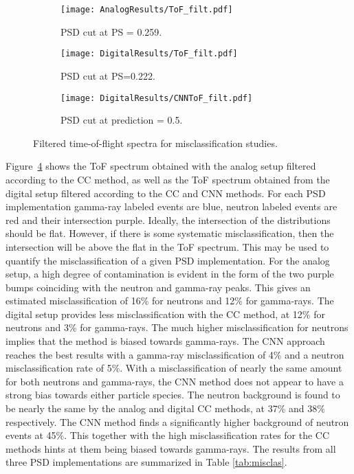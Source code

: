 \documentclass[main.tex]{subfiles}
\begin{document}
\begin{figure}
    \centering
    \begin{subfigure}[bh]{\textwidth}
   	   	\centering
	    \texttt{[image: AnalogResults/ToF\_filt.pdf]}
    	\caption{PSD cut at PS = 0.259.}
    	\label{fig:ToF_filt_A}
   	\end{subfigure}
    \begin{subfigure}[bh]{\textwidth}
   	    \centering
        \texttt{[image: DigitalResults/ToF\_filt.pdf]}
        \caption{PSD cut at PS=0.222.}
        \label{fig:ToF_filt_D}
    \end{subfigure}
	\begin{subfigure}[bh]{\textwidth}
	    \centering
        \texttt{[image: DigitalResults/CNNToF\_filt.pdf]}
        \caption{PSD cut at prediction = 0.5.}
        \label{fig:ToF_filt_D_CNN}
    \end{subfigure}
	\caption[Filtered time-of-flight spectra for misclassification studies.]{Filtered time-of-flight spectra for misclassification studies.}
    \label{fig:tof_cc_cnn}
\end{figure}

Figure~\ref{fig:tof_cc_cnn} shows the ToF spectrum obtained with the analog setup filtered according to the CC method, as well as the ToF spectrum obtained from the digital setup filtered according to the CC and CNN methods.
For each PSD implementation gamma-ray labeled events are blue, neutron labeled events are red and their intersection purple. 
Ideally, the intersection of the distributions should be flat. However, if there is some systematic misclassification, then the intersection will be above the flat in the ToF spectrum. This may be used to quantify the misclassification of a given PSD implementation.
For the analog setup, a high degree of contamination is evident in the form of the two purple bumps coinciding with the neutron and gamma-ray peaks. This gives an estimated misclassification of 16\% for neutrons and 12\% for gamma-rays. 
The digital setup provides less misclassification with the CC method, at 12\% for neutrons and 3\% for gamma-rays. The much higher misclassification for neutrons implies that the method is biased towards gamma-rays.
The CNN approach reaches the best results with a gamma-ray misclassification of 4\% and a neutron misclassification rate of 5\%.
With a misclassification of nearly the same amount for both neutrons and gamma-rays, the CNN method does not appear to have a strong bias towards either particle species.
The neutron background is found to be nearly the same by the analog and digital CC methods, at 37\% and 38\% respectively. The CNN method finds a significantly higher background of neutron events at 45\%. This together with the high misclassification rates for the CC methods hints at them being biased towards gamma-rays.
The results from all three PSD implementations are summarized in Table \ref{tab:misclas}.
\end{document}
